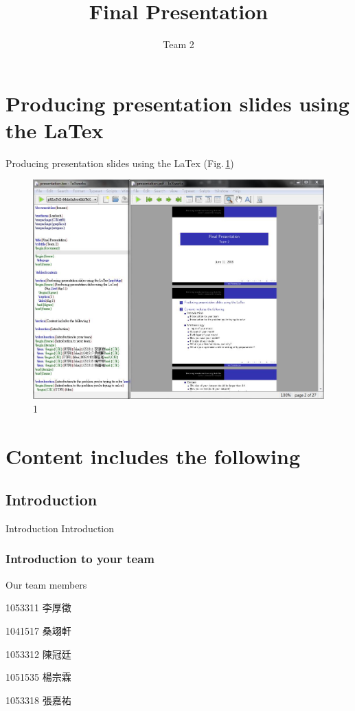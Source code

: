 \documentclass{beamer}
\title{Final Presentation}
\subtitle{Team 2}
\begin{document}
\begin{frame}
  \titlepage
\end{frame}

 \tableofcontents

\section{Producing presentation slides using the LaTex}
\begin{frame}{Producing presentation slides using the LaTex}
	(Fig.\,\ref{fig:1})
    \begin{figure}
  \includegraphics[width=0.7\linewidth]{latex.jpg}
    \caption{1}
    \label{fig:1}
  \end{figure}
\end{frame}


\section{Content includes the following }

\subsection{Introduction}

\begin{frame}{Introduction}
\center \huge Introduction
\end{frame} 


\subsubsection{Introduction to your team}
\begin{frame}{Our team members}
\begin{itemize}
\begin{CJK}{UTF8}{bkai}
  \item   1053311 李厚徵
  \item   1041517 桑翊軒
  \item   1053312 陳冠廷
  \item   1051535 楊宗霖
  \item   1053318 張嘉祐
\end{CJK}
\end{itemize}
\end{frame}
\end{document}
